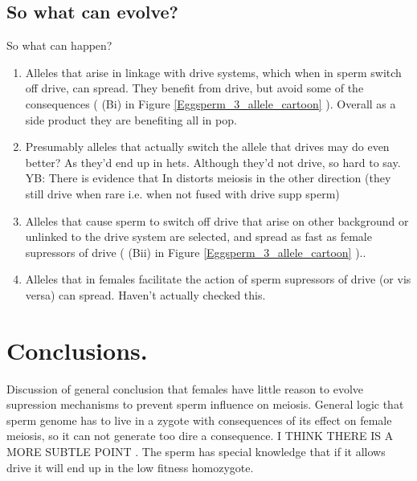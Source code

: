 \documentclass[12pt,letterpaper]{article}
\begin{document}
\subsection{So what can evolve?}
So what can happen?
\begin{enumerate}
\item Alleles that arise in linkage with drive systems, which when in sperm switch off drive, 
can spread. They benefit from drive, but avoid some of the
consequences ( (Bi) in Figure \ref{Eggsperm_3_allele_cartoon} ). Overall as a side product they are benefiting all in pop.\\
\item Presumably alleles that actually switch the allele that drives may do even better? As they'd end up in 
hets. Although they'd not drive, so hard to say. YB: There is evidence that In distorts meiosis in the other direction (they still drive when rare i.e. when not fused with drive supp sperm) \\
\item Alleles that cause sperm to switch off drive that arise on other background or unlinked to the drive system
are selected, and spread as fast as female supressors of drive ( (Bii) in Figure \ref{Eggsperm_3_allele_cartoon} )..\\
\item Alleles that in females facilitate the action of sperm supressors of drive (or vis versa) can spread. Haven't actually checked this.\\
\end{enumerate}

\section*{Conclusions.}
Discussion of general conclusion that females have little reason to evolve supression mechanisms to prevent sperm influence on meiosis. 
General logic that sperm genome has to live in a zygote with consequences of its effect on female meiosis, so
it can not generate too dire a consequence.
I THINK THERE IS A MORE SUBTLE POINT . The sperm has special knowledge
that if it allows drive it will end up in the low fitness homozygote. 


\end{document}
